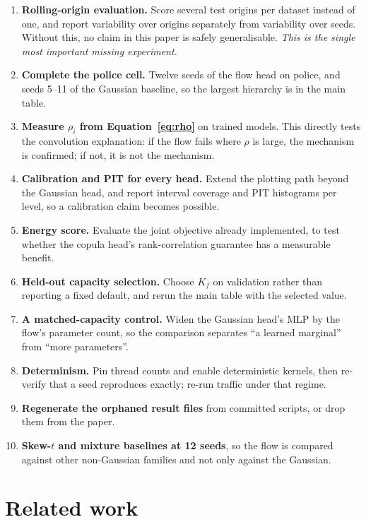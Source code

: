 \documentclass[11pt]{article}
\begin{document}
\begin{enumerate}
\item \textbf{Rolling-origin evaluation.} Score several test origins per dataset
instead of one, and report variability over origins separately from variability over
seeds. Without this, no claim in this paper is safely generalisable. \emph{This is
the single most important missing experiment.}
\item \textbf{Complete the police cell.} Twelve seeds of the flow head on police, and
seeds 5--11 of the Gaussian baseline, so the largest hierarchy is in the main table.
\item \textbf{Measure $\rho_i$ from Equation~\eqref{eq:rho}} on trained models. This
directly tests the convolution explanation: if the flow fails where $\rho$ is large,
the mechanism is confirmed; if not, it is not the mechanism.
\item \textbf{Calibration and PIT for every head.} Extend the plotting path beyond
the Gaussian head, and report interval coverage and PIT histograms per level, so a
calibration claim becomes possible.
\item \textbf{Energy score.} Evaluate the joint objective already implemented, to test
whether the copula head's rank-correlation guarantee has a measurable benefit.
\item \textbf{Held-out capacity selection.} Choose $K_f$ on validation rather than
reporting a fixed default, and rerun the main table with the selected value.
\item \textbf{A matched-capacity control.} Widen the Gaussian head's MLP by the
flow's parameter count, so the comparison separates ``a learned marginal'' from
``more parameters''.
\item \textbf{Determinism.} Pin thread counts and enable deterministic kernels, then
re-verify that a seed reproduces exactly; re-run traffic under that regime.
\item \textbf{Regenerate the orphaned result files} from committed scripts, or drop
them from the paper.
\item \textbf{Skew-$t$ and mixture baselines at 12 seeds}, so the flow is compared
against other non-Gaussian families and not only against the Gaussian.
\end{enumerate}

\section{Related work}
\label{sec:related}
\end{document}

